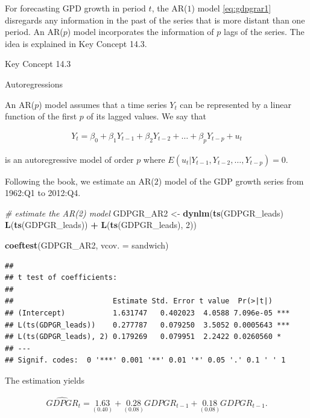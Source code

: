 \documentclass[]{book}
\newenvironment{Shaded}{\begin{snugshade}}{\end{snugshade}}
\newcommand{\KeywordTok}[1]{\textcolor[rgb]{0.13,0.29,0.53}{\textbf{#1}}}
\newcommand{\DataTypeTok}[1]{\textcolor[rgb]{0.13,0.29,0.53}{#1}}
\newcommand{\DecValTok}[1]{\textcolor[rgb]{0.00,0.00,0.81}{#1}}
\newcommand{\StringTok}[1]{\textcolor[rgb]{0.31,0.60,0.02}{#1}}
\newcommand{\CommentTok}[1]{\textcolor[rgb]{0.56,0.35,0.01}{\textit{#1}}}
\newcommand{\OperatorTok}[1]{\textcolor[rgb]{0.81,0.36,0.00}{\textbf{#1}}}
\newcommand{\NormalTok}[1]{#1}
\theoremstyle{definition}
\theoremstyle{definition}
\theoremstyle{definition}
\theoremstyle{remark}
\begin{document}
For forecasting GPD growth in period \(t\), the AR(\(1\)) model
\eqref{eq:gdpgrar1} disregards any information in the past of the series
that is more distant than one period. An AR(\(p\)) model incorporates
the information of \(p\) lags of the series. The idea is explained in
Key Concept 14.3.

Key Concept 14.3

Autoregressions

An AR(\(p\)) model assumes that a time series \(Y_t\) can be represented
by a linear function of the first \(p\) of its lagged values. We say
that

\begin{align*}
  Y_t = \beta_0 + \beta_1 Y_{t-1} + \beta_2 Y_{t-2} + \dots + \beta_p Y_{t-p} + u_t
\end{align*}

is an autoregressive model of order \(p\) where
\(E(u_t\vert Y_{t-1}, Y_{t-2}, \dots,Y_{t-p})=0\).

Following the book, we estimate an AR(\(2\)) model of the GDP growth
series from 1962:Q1 to 2012:Q4.

\begin{Shaded}
\begin{Highlighting}[]
\CommentTok{# estimate the AR(2) model}
\NormalTok{GDPGR_AR2 <-}\StringTok{ }\KeywordTok{dynlm}\NormalTok{(}\KeywordTok{ts}\NormalTok{(GDPGR_leads) }\OperatorTok{~}\StringTok{ }\KeywordTok{L}\NormalTok{(}\KeywordTok{ts}\NormalTok{(GDPGR_leads)) }\OperatorTok{+}\StringTok{ }\KeywordTok{L}\NormalTok{(}\KeywordTok{ts}\NormalTok{(GDPGR_leads), }\DecValTok{2}\NormalTok{))}

\KeywordTok{coeftest}\NormalTok{(GDPGR_AR2, }\DataTypeTok{vcov. =}\NormalTok{ sandwich)}
\end{Highlighting}
\end{Shaded}

\begin{verbatim}
## 
## t test of coefficients:
## 
##                       Estimate Std. Error t value  Pr(>|t|)    
## (Intercept)           1.631747   0.402023  4.0588 7.096e-05 ***
## L(ts(GDPGR_leads))    0.277787   0.079250  3.5052 0.0005643 ***
## L(ts(GDPGR_leads), 2) 0.179269   0.079951  2.2422 0.0260560 *  
## ---
## Signif. codes:  0 '***' 0.001 '**' 0.01 '*' 0.05 '.' 0.1 ' ' 1
\end{verbatim}

The estimation yields

\begin{align}
  \widehat{GDPGR}_t = \underset{(0.40)}{1.63} + \underset{(0.08)}{0.28} GDPGR_{t-1} + \underset{(0.08)}{0.18} GDPGR_{t-1}. \label{eq:GDPGRAR2}
\end{align}
\end{document}
